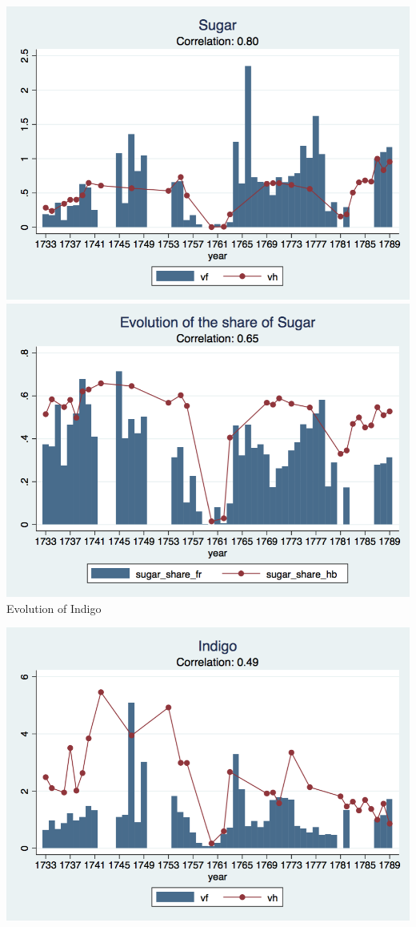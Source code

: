 \documentclass[12pt,a4paper,titlepage,english]{article}
\begin{document}
\includegraphics[scale=.28]{sugar_long.png}
\includegraphics[scale=.28]{sugar_share_long.png}\\
\caption{Evolution of Indigo}
\includegraphics[scale=.28]{indigo_long.png}
\end{document}

